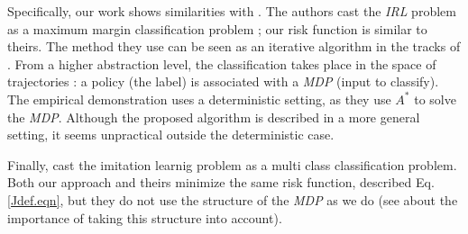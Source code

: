 \documentclass{article}
\begin{document}

Specifically, our work shows similarities with \cite{ratliff2006maximum}. The authors cast the \emph{IRL} problem as a maximum margin classification problem ; our risk function is similar to theirs. The method they use can be seen as an iterative algorithm in the tracks of \cite{abbeel2004apprenticeship}. From a higher abstraction level, the classification takes place in the space of trajectories : a policy (the label) is associated with a \emph{MDP} (input to classify). The empirical demonstration uses a deterministic setting, as they use $A^*$ to solve the \emph{MDP}. Although the proposed algorithm is described in a more general setting, it seems unpractical outside the deterministic case.

Finally, \citep{ratliff2007imitation} cast the imitation learnig problem as a multi class classification problem. Both our approach and theirs minimize the same risk function, described Eq. \eqref{Jdef.eqn}, but they do not use the structure of the \emph{MDP} as we do (see \cite{melo2010learning} about the importance of taking this structure into account).\\
\end{document}
